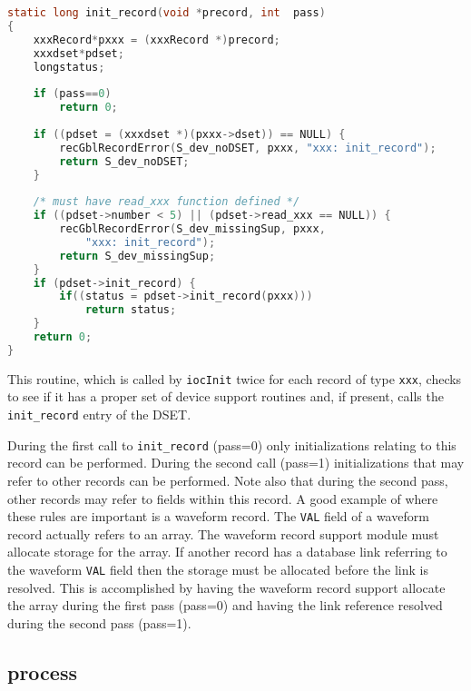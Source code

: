 \begin{lstlisting}[language=C]
static long init_record(void *precord, int  pass)
{
    xxxRecord*pxxx = (xxxRecord *)precord;
    xxxdset*pdset;
    longstatus;
    
    if (pass==0)
        return 0;
    
    if ((pdset = (xxxdset *)(pxxx->dset)) == NULL) {
        recGblRecordError(S_dev_noDSET, pxxx, "xxx: init_record");
        return S_dev_noDSET;
    }
    
    /* must have read_xxx function defined */
    if ((pdset->number < 5) || (pdset->read_xxx == NULL)) {
        recGblRecordError(S_dev_missingSup, pxxx,
            "xxx: init_record");
        return S_dev_missingSup;
    }
    if (pdset->init_record) {
        if((status = pdset->init_record(pxxx)))
            return status;
    }
    return 0;
}
\end{lstlisting}

This routine, which is called by \verb|iocInit| twice for each record of type \verb|xxx|, checks to see if it has a proper set of device support routines and, if present, calls the \verb|init_record| entry of the DSET.

During the first call to \verb|init_record| (pass=0) only initializations relating to this record can be performed.
During the second call (pass=1) initializations that may refer to other records can be performed.
Note also that during the second pass, other records may refer to fields within this record.
A good example of where these rules are important is a waveform record.
The \verb|VAL| field of a waveform record actually refers to an array.
The waveform record support module must allocate storage for the array.
If another record has a database link referring to the waveform \verb|VAL| field then the storage must be allocated before the link is resolved.
This is accomplished by having the waveform record support allocate the array during the first pass (pass=0) and having the link reference resolved during the second pass (pass=1).

\subsection{process}

